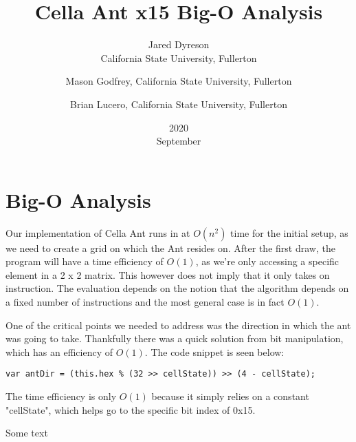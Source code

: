 \documentclass{article}
\title{Cella Ant x15 Big-O Analysis}
\date{2020\\ September}
\author{Jared Dyreson\\ California State University, Fullerton 
\and Mason Godfrey, California State University, Fullerton
\and Brian Lucero, California State University, Fullerton}
\begin{document}
\maketitle
\tableofcontents
\newpage

\section{Big-O Analysis}

Our implementation of Cella Ant runs in at $O(n^2)$ time for the initial setup, as we need to create a grid on which the Ant resides on.
After the first draw, the program will have a time efficiency of $O(1)$, as we're only accessing a specific element in a 2 x 2 matrix.
This however does not imply that it only takes on instruction.
The evaluation depends on the notion that the algorithm depends on a fixed number of instructions and the most general case is in fact $O(1)$.


One of the critical points we needed to address was the direction in which the ant was going to take.
Thankfully there was a quick solution from bit manipulation, which has an efficiency of $O(1)$.
The code snippet is seen below:

\begin{lstlisting}
var antDir = (this.hex % (32 >> cellState)) >> (4 - cellState);
\end{lstlisting}

The time efficiency is only $O(1)$ because it simply relies on a constant "cellState", which helps go to the specific bit index of 0x15.

Some text
\end{document}
